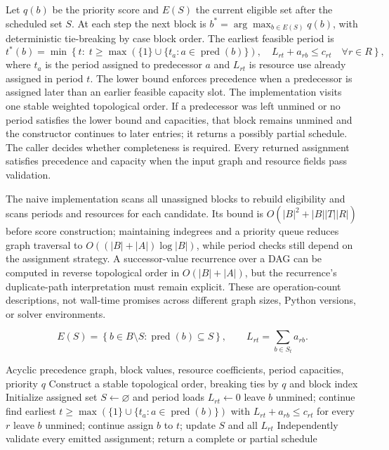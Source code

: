 Let $q(b)$ be the priority score and $E(S)$ the current eligible set after the scheduled set $S$. At each step the next block is $b^*=\arg\max_{b\in E(S)}q(b)$, with deterministic tie-breaking by case block order. The earliest feasible period is
\begin{equation}
t^*(b)=\min\left\{t:\;t\geq\max\left(\{1\}\cup\{t_a:a\in\operatorname{pred}(b)\}\right),\quad L_{rt}+a_{rb}\leq c_{rt}\quad\forall r\in R\right\},
\end{equation}
where $t_a$ is the period assigned to predecessor $a$ and $L_{rt}$ is resource use already assigned in period $t$. The lower bound enforces precedence when a predecessor is assigned later than an earlier feasible capacity slot. The implementation visits one stable weighted topological order. If a predecessor was left unmined or no period satisfies the lower bound and capacities, that block remains unmined and the constructor continues to later entries; it returns a possibly partial schedule. The caller decides whether completeness is required. Every returned assignment satisfies precedence and capacity when the input graph and resource fields pass validation.

The naive implementation scans all unassigned blocks to rebuild eligibility and scans periods and resources for each candidate. Its bound is $O(|B|^2+|B||T||R|)$ before score construction; maintaining indegrees and a priority queue reduces graph traversal to $O((|B|+|A|)\log |B|)$, while period checks still depend on the assignment strategy. A successor-value recurrence over a DAG can be computed in reverse topological order in $O(|B|+|A|)$, but the recurrence's duplicate-path interpretation must remain explicit. These are operation-count descriptions, not wall-time promises across different graph sizes, Python versions, or solver environments.

\begin{equation}
 E(S)=\left\{b\in B\setminus S:\operatorname{pred}(b)\subseteq S\right\},\qquad
 L_{rt}=\sum_{b\in S_t}a_{rb}.
\end{equation}
\begin{algorithm}
\caption{Construct a feasible schedule from a block priority}
\label{alg:constructive}
\begin{algorithmic}[1]
\Require Acyclic precedence graph, block values, resource coefficients, period capacities, priority $q$
\State Construct a stable topological order, breaking ties by $q$ and block index
\State Initialize assigned set $S\gets\varnothing$ and period loads $L_{rt}\gets0$
   \State leave $b$ unmined; continue \EndIf
  \State find earliest $t\geq\max(\{1\}\cup\{t_a:a\in\operatorname{pred}(b)\})$ with $L_{rt}+a_{rb}\leq c_{rt}$ for every $r$
   \State leave $b$ unmined; continue \EndIf
  \State assign $b$ to $t$; update $S$ and all $L_{rt}$
\EndFor
\State Independently validate every emitted assignment; return a complete or partial schedule
\end{algorithmic}
\end{algorithm}

